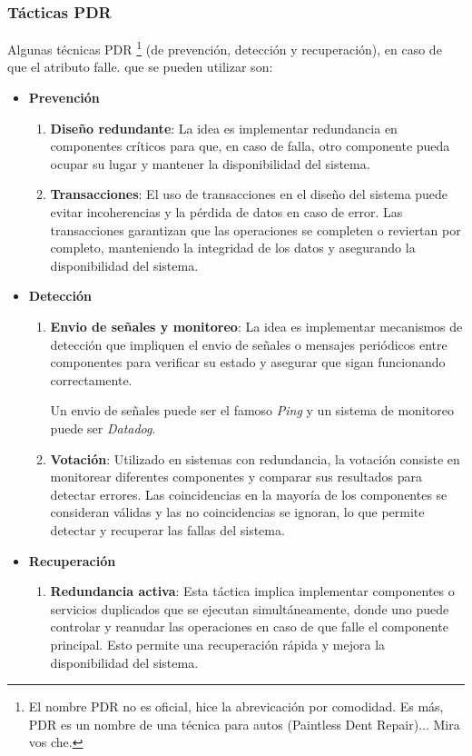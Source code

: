 \documentclass{article}
\begin{document}
		
		\subsubsection{Tácticas PDR}\label{sec:tacticas_disponibilidad}
			Algunas técnicas PDR \footnote{El nombre PDR no es oficial, hice la abrevicación por comodidad. Es más, PDR es un nombre de una técnica para autos (Paintless Dent Repair)... Mira vos che. } (de prevención, detección y recuperación), en caso de que el atributo falle. que se pueden utilizar son: 
			
			\begin{itemize}		
				\item \textbf{Prevención}
				\begin{enumerate}
					\item \textbf{Diseño redundante}: La idea es implementar redundancia en componentes críticos para que, en caso de falla, otro componente pueda ocupar su lugar y mantener la disponibilidad del sistema.
					
					\item \textbf{Transacciones}: El uso de transacciones en el diseño del sistema puede evitar incoherencias y la pérdida de datos en caso de error. Las transacciones garantizan que las operaciones se completen o reviertan por completo, manteniendo la integridad de los datos y asegurando la disponibilidad del sistema.
				\end{enumerate}
				\item \textbf{Detección}
				\begin{enumerate}
					\item \textbf{Envio de señales y monitoreo}: La idea es implementar mecanismos de detección que impliquen el envio de señales o mensajes periódicos entre componentes para verificar su estado y asegurar que sigan funcionando correctamente. 
				
					Un envio de señales puede ser el famoso \textit{Ping} y un sistema de monitoreo puede ser \textit{Datadog}.
					
					\item \textbf{Votación}: Utilizado en sistemas con redundancia, la votación consiste en monitorear diferentes componentes y comparar sus resultados para detectar errores. Las coincidencias en la mayoría de los componentes se consideran válidas y las no coincidencias se ignoran, lo que permite detectar y recuperar las fallas del sistema.
				\end{enumerate}
				
				\item \textbf{Recuperación}
				\begin{enumerate}
					\item \textbf{Redundancia activa}: Esta táctica implica implementar componentes o servicios duplicados que se ejecutan simultáneamente, donde uno puede controlar y reanudar las operaciones en caso de que falle el componente principal. Esto permite una recuperación rápida y mejora la disponibilidad del sistema.
					

\end{enumerate}
\end{itemize}
\end{document}
